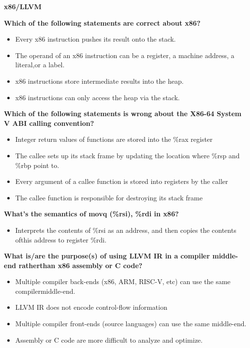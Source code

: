 

\scriptsize
\hspace{3mm}



{\normalsize\textbf{x86/LLVM}}

\textbf{Which of the following statements are correct about x86?}
\begin{itemize}

\item[\textcolor{red}{W}] Every x86 instruction pushes its result onto the stack.
\item[\textcolor{green}{C}] The operand of an x86 instruction can be a register, a machine address, a literal,or a label.
\item[\textcolor{red}{W}] x86 instructions store intermediate results into the heap.
\item[\textcolor{red}{W}] x86 instructions can only access the heap via the stack.
\end{itemize}


\textbf{Which of the following statements is wrong about the X86-64 System V ABI calling convention?}
\begin{itemize}

\item[\textcolor{green}{C}] Integer return values of functions are stored into the \%rax register
\item[\textcolor{red}{W}] The callee sets up its stack frame by updating the location where \%rsp and \%rbp point to.
\item[\textcolor{green}{C}] Every argument of a callee function is stored into registers by the caller
\item[\textcolor{green}{C}] The callee function is responsible for destroying its stack frame
\end{itemize}



\textbf{What’s the semantics of movq (\%rsi), \%rdi in x86?}
\begin{itemize}
\item[\textcolor{green}{C}] Interprets the contents of \%rsi as an address, and then copies the contents ofthis address to register \%rdi. 

\end{itemize}



\textbf{What is/are the purpose(s) of using LLVM IR in a compiler middle-end ratherthan x86 assembly or C code?}
\begin{itemize}

\item[\textcolor{green}{C}] Multiple compiler back-ends (x86, ARM, RISC-V, etc) can use the same compilermiddle-end.
\item[\textcolor{red}{W}] LLVM IR does not encode control-flow information
\item[\textcolor{green}{C}] Multiple compiler front-ends (source languages) can use the same middle-end.
\item[\textcolor{green}{C}] Assembly or C code are more difficult to analyze and optimize.
\end{itemize}


